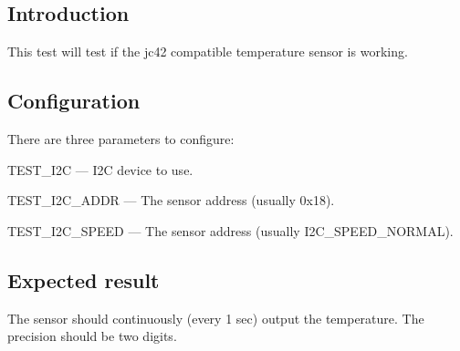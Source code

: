 \subsection*{Introduction}

This test will test if the jc42 compatible temperature sensor is working.

\subsection*{Configuration}

There are three parameters to configure\+:


\begin{DoxyItemize}
\item {\ttfamily T\+E\+S\+T\+\_\+\+I2C} --- I2C device to use.
\item {\ttfamily T\+E\+S\+T\+\_\+\+I2\+C\+\_\+\+A\+D\+DR} --- The sensor address (usually 0x18).
\item {\ttfamily T\+E\+S\+T\+\_\+\+I2\+C\+\_\+\+S\+P\+E\+ED} --- The sensor address (usually I2\+C\+\_\+\+S\+P\+E\+E\+D\+\_\+\+N\+O\+R\+M\+AL).
\end{DoxyItemize}

\subsection*{Expected result}

The sensor should continuously (every 1 sec) output the temperature. The precision should be two digits. 